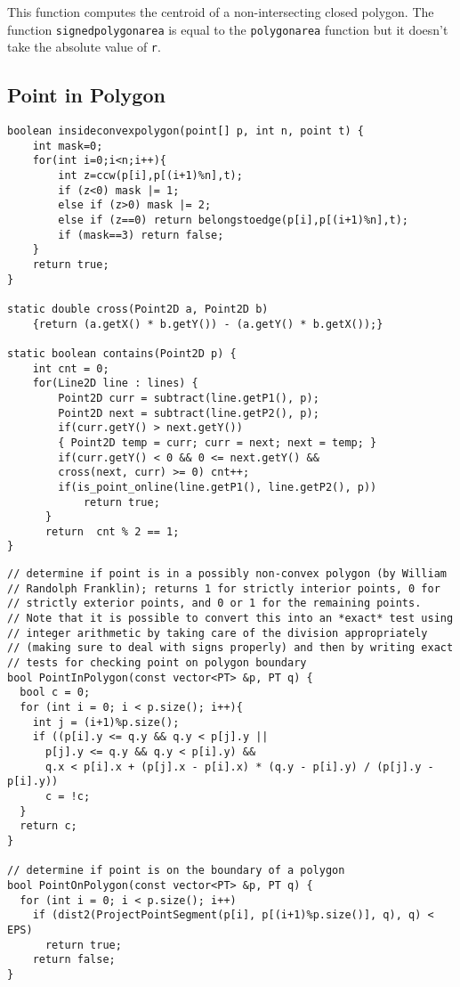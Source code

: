 \documentclass[10pt,letterpaper,twocolumn,twosided]{article}
\begin{document}
This function computes the centroid of a non-intersecting closed polygon. The function \verb+signedpolygonarea+ is equal to the \verb+polygonarea+ function but it doesn't take the  absolute value of \verb+r+.

\subsection{Point in Polygon}

\begin{lstlisting}
boolean insideconvexpolygon(point[] p, int n, point t) {
    int mask=0;
    for(int i=0;i<n;i++){
        int z=ccw(p[i],p[(i+1)%n],t);
        if (z<0) mask |= 1;
        else if (z>0) mask |= 2;
        else if (z==0) return belongstoedge(p[i],p[(i+1)%n],t); 
        if (mask==3) return false;
    }
    return true;
}

static double cross(Point2D a, Point2D b) 
    {return (a.getX() * b.getY()) - (a.getY() * b.getX());}

static boolean contains(Point2D p) {
    int cnt = 0;
    for(Line2D line : lines) {
        Point2D curr = subtract(line.getP1(), p); 
        Point2D next = subtract(line.getP2(), p);
        if(curr.getY() > next.getY()) 
        { Point2D temp = curr; curr = next; next = temp; }
        if(curr.getY() < 0 && 0 <= next.getY() && 
        cross(next, curr) >= 0) cnt++;
        if(is_point_online(line.getP1(), line.getP2(), p))
            return true;
      }
	  return  cnt % 2 == 1;
}
\end{lstlisting}

\begin{lstlisting}
// determine if point is in a possibly non-convex polygon (by William
// Randolph Franklin); returns 1 for strictly interior points, 0 for
// strictly exterior points, and 0 or 1 for the remaining points.
// Note that it is possible to convert this into an *exact* test using
// integer arithmetic by taking care of the division appropriately
// (making sure to deal with signs properly) and then by writing exact
// tests for checking point on polygon boundary
bool PointInPolygon(const vector<PT> &p, PT q) {
  bool c = 0;
  for (int i = 0; i < p.size(); i++){
    int j = (i+1)%p.size();
    if ((p[i].y <= q.y && q.y < p[j].y || 
      p[j].y <= q.y && q.y < p[i].y) &&
      q.x < p[i].x + (p[j].x - p[i].x) * (q.y - p[i].y) / (p[j].y - p[i].y))
      c = !c;
  }
  return c;
}

// determine if point is on the boundary of a polygon
bool PointOnPolygon(const vector<PT> &p, PT q) {
  for (int i = 0; i < p.size(); i++)
    if (dist2(ProjectPointSegment(p[i], p[(i+1)%p.size()], q), q) < EPS)
      return true;
    return false;
}
\end{lstlisting}
\end{document}
